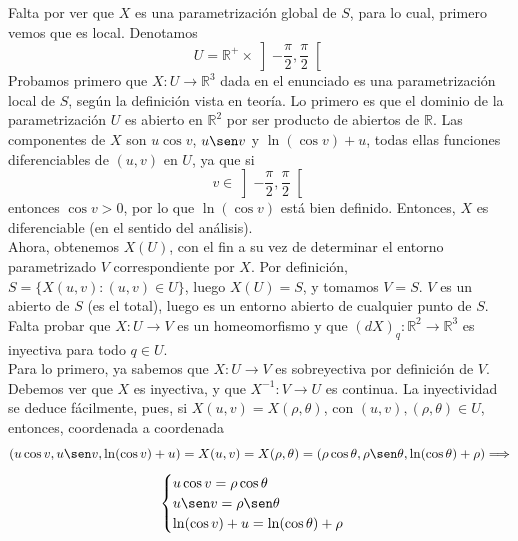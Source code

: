 \documentclass[12pt]{article}
\newcommand{\R}{\mathbb{R}}
\newcommand{\Rmas}{\R^{+}}
\begin{document}
\begin{ejercicio}
\begin{enumerate}
            Falta por ver que $X$ es una parametrización global de $S$, para lo cual, primero vemos que es local. Denotamos 
            $$U = \Rmas \times \left] -\dfrac{\pi}{2}, \dfrac{\pi}{2} \right[ $$
            Probamos primero que $X: U \to \R^3$ dada en el enunciado es una parametrización local de $S$, según la definición vista en teoría.
            Lo primero es que el dominio de la parametrización $U$ es abierto en $\R^2$ por 
            ser producto de abiertos de $\R$. Las componentes de $X$ son $u \cos v$, $u \sen v$ y $\ln(\cos v) + u$, todas ellas 
            funciones diferenciables de $(u, v)$ en $U$, ya que si $$v \in \left] -\dfrac{\pi}{2}, \dfrac{\pi}{2} \right[$$ 
            entonces $\cos v > 0$, por lo que $\ln(\cos v)$ está bien definido. Entonces, $X$ es diferenciable (en el sentido del análisis). \\

            Ahora, obtenemos $X(U)$, con el fin a su vez de determinar el entorno parametrizado $V$ correspondiente por $X$. Por 
            definición, $S = \{X(u,v) : (u,v) \in U\}$, luego $X(U) = S$, y tomamos $V = S$. $V$ es un abierto de $S$
            (es el total), luego es un entorno abierto de cualquier punto de $S$. 
            Falta probar que $X : U \to V$ es un homeomorfismo y que $(dX)_q : \R^2 \to \R^3$
            es inyectiva para todo $q \in U$. \\

            Para lo primero, ya sabemos que $X : U \to V$ es sobreyectiva por definición de $V$. Debemos ver que $X$ es inyectiva, y que 
            $X^{-1} : V \to U$ es continua. La inyectividad se deduce fácilmente, pues, si $X(u, v) = X(\rho, \theta)$, 
            con $(u, v), (\rho, \theta) \in U$, entonces, coordenada
            a coordenada
            $$(u \cos v, u \sen v, \ln(\cos v) + u) = X(u,v) = X(\rho, \theta) = (\rho \cos \theta, \rho \sen \theta, \ln(\cos \theta) + \rho) 
            \Longrightarrow$$
            $$\begin{cases}
                u \cos v = \rho \cos \theta \\
                u \sen v = \rho \sen \theta \\
                \ln(\cos v) + u = \ln(\cos \theta) + \rho
            \end{cases}$$
            

\end{enumerate}
\end{ejercicio}
\end{document}
